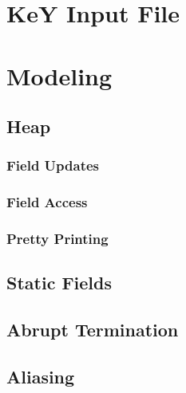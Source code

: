 \documentclass[a4paper, 11pt, accentcolor = tud3b]{tudreport}
\begin{document}
        \section{KeY Input File} %

        \section{Modeling} %

            \subsection{Heap} %

                \subsubsection{Field Updates} %

                \subsubsection{Field Access} %

                \subsubsection{Pretty Printing} %

            \subsection{Static Fields} %

            \subsection{Abrupt Termination} %

            \subsection{Aliasing} %
\end{document}
